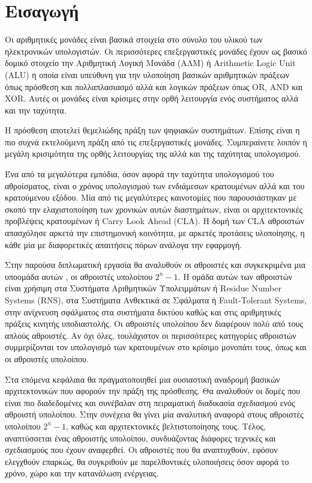 
\section{Εισαγωγή}

Οι αριθμητικές μονάδες είναι βασικά στοιχεία στο σύνολο του υλικού των ηλεκτρονικών υπολογιστών. Οι περισσότερες επεξεργαστικές μονάδες έχουν ως βασικό δομικό στοιχείο την Αριθμητική Λογική Μονάδα (ΑΛΜ) ή Arithmetic Logic Unit (ALU) η οποία είναι υπεύθυνη για την υλοποίηση βασικών αριθμητικών πράξεων όπως πρόσθεση και πολλαπλασιασμό αλλά και λογικών πράξεων όπως OR, AND και XOR. Αυτές οι μονάδες είναι κρίσιμες στην ορθή λειτουργία ενός συστήματος αλλά και την ταχύτητα.

Η πρόσθεση αποτελεί θεμελιώδης πράξη των ψηφιακών συστημάτων. Επίσης είναι η πιο συχνά εκτελούμενη πράξη από τις επεξεργαστικές μονάδες. Συμπεραίνετε λοιπόν η μεγάλη κρισιμότητα της ορθής λειτουργίας της αλλά και της ταχύτητας υπολογισμού. 

Ένα από τα μεγαλύτερα εμπόδια, όσον αφορά την ταχύτητα υπολογισμού του αθροίσματος, είναι ο χρόνος υπολογισμού των ενδιάμεσων κρατουμένων αλλά και του κρατούμενου εξόδου. Μία από τις μεγαλύτερες καινοτομίες που παρουσιάστηκαν με σκοπό την ελαχιστοποίηση των χρονικών αυτών διαστημάτων, είναι οι αρχιτεκτονικές προβλέψεις κρατουμένων ή Carry Look Ahead (CLA). Η δομή των CLA αθροιστών απασχόλησε αρκετά την επιστημονική κοινότητα, με αρκετές προτάσεις υλοποίησης, η κάθε μία με διαφορετικές απαιτήσεις πόρων ανάλογα την εφαρμογή.


Στην παρούσα διπλωματική εργασία θα αναλυθούν οι αθροιστές και συγκεκριμένα μια υποομάδα αυτών , οι αθροιστές υπολοίπου $2^n-1$. Η ομάδα αυτών των αθροιστών είναι χρήσιμη στα Συστήματα Αριθμητικών Υπολειμμάτων ή Residue Number Systems (RNS), στα Συστήματα Ανθεκτικά σε Σφάλματα ή Fault-Tolerant Systems, στην ανίχνευση σφάλματος στα συστήματα δικτύου καθώς και στις αριθμητικές πράξεις κινητής υποδιαστολής. Οι αθροιστές υπολοίπου δεν διαφέρουν πολύ από τους απλούς αθροιστές. Αν όχι όλες, τουλάχιστον οι περισσότερες κατηγορίες αθροιστών συμμερίζονται τον υπολογισμό των κρατουμένων στο κρίσιμο μονοπάτι τους, όπως και οι αθροιστές υπολοίπου.

Στα επόμενα κεφάλαια θα πραγματοποιηθεί μια ουσιαστική αναδρομή βασικών αρχιτεκτονικών 
που αφορούν την πράξη της πρόσθεσης. Θα αναλυθούν οι δομές που είναι πιο διαδεδομένες και
συνέβαλαν στη πειραματική διαδικασία σχεδιασμού ενός αθροιστή υπολοίπου. Στην συνέχεια 
θα γίνει μία αναλυτική αναφορά στους αθροιστές υπολοίπου $2^n-1$, καθώς και αρχιτεκτονικές
βελτιστοποίησης τους. Τέλος, αναπτύσσεται ένας αθροιστής υπολοίπου, συνδυάζοντας διάφορες 
τεχνικές και σχεδιασμούς που έχουν αναφερθεί. Οι αθροιστές που θα αναπτυχθούν, εφόσον ελεγχθούν επαρκώς, θα συγκριθούν με παρελθοντικές υλοποιήσεις όσον αφορά το χρόνο, χώρο και την κατανάλωση ενέργειας.

